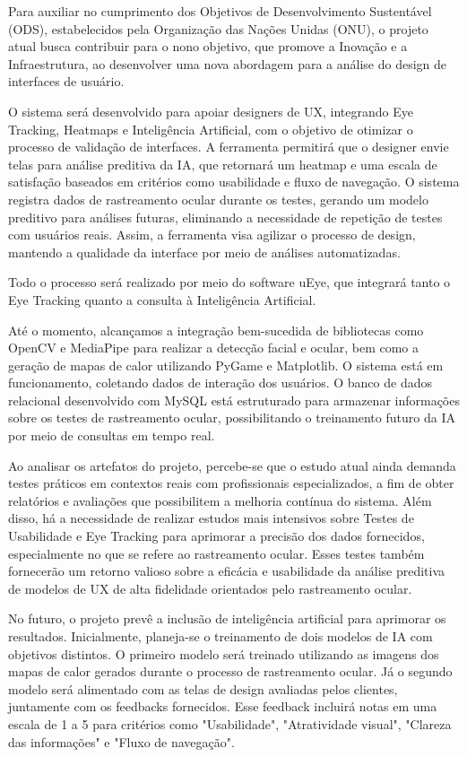 Para auxiliar no cumprimento dos Objetivos de Desenvolvimento Sustentável (ODS), estabelecidos pela Organização das Nações Unidas (ONU), o projeto atual busca contribuir para o nono objetivo, que promove a Inovação e a Infraestrutura, ao desenvolver uma nova abordagem para a análise do design de interfaces de usuário. \textcite{ODS2024}

O sistema será desenvolvido para apoiar designers de UX, integrando Eye Tracking, Heatmaps e Inteligência Artificial, com o objetivo de otimizar o processo de validação de interfaces. A ferramenta permitirá que o designer envie telas para análise preditiva da IA, que retornará um heatmap e uma escala de satisfação baseados em critérios como usabilidade e fluxo de navegação. O sistema registra dados de rastreamento ocular durante os testes, gerando um modelo preditivo para análises futuras, eliminando a necessidade de repetição de testes com usuários reais. Assim, a ferramenta visa agilizar o processo de design, mantendo a qualidade da interface por meio de análises automatizadas.

Todo o processo será realizado por meio do software uEye, que integrará tanto o Eye Tracking quanto a consulta à Inteligência Artificial.

Até o momento, alcançamos a integração bem-sucedida de bibliotecas como OpenCV e MediaPipe para realizar a detecção facial e ocular, bem como a geração de mapas de calor utilizando PyGame e Matplotlib. O sistema está em funcionamento, coletando dados de interação dos usuários. O banco de dados relacional desenvolvido com MySQL está estruturado para armazenar informações sobre os testes de rastreamento ocular, possibilitando o treinamento futuro da IA por meio de consultas em tempo real.

Ao analisar os artefatos do projeto, percebe-se que o estudo atual ainda demanda testes práticos em contextos reais com profissionais especializados, a fim de obter relatórios e avaliações que possibilitem a melhoria contínua do sistema. Além disso, há a necessidade de realizar estudos mais intensivos sobre Testes de Usabilidade e Eye Tracking para aprimorar a precisão dos dados fornecidos, especialmente no que se refere ao rastreamento ocular. Esses testes também fornecerão um retorno valioso sobre a eficácia e usabilidade da análise preditiva de modelos de UX de alta fidelidade orientados pelo rastreamento ocular.

No futuro, o projeto prevê a inclusão de inteligência artificial para aprimorar os resultados. Inicialmente, planeja-se o treinamento de dois modelos de IA com objetivos distintos. O primeiro modelo será treinado utilizando as imagens dos mapas de calor gerados durante o processo de rastreamento ocular. Já o segundo modelo será alimentado com as telas de design avaliadas pelos clientes, juntamente com os feedbacks fornecidos. Esse feedback incluirá notas em uma escala de 1 a 5 para critérios como "Usabilidade", "Atratividade visual", "Clareza das informações" e "Fluxo de navegação".


